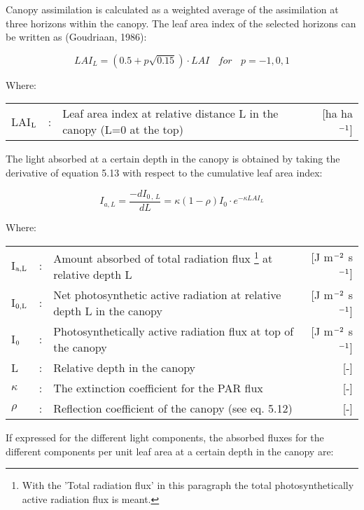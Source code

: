 Canopy assimilation is calculated as a weighted average of the assimilation at three
horizons within the canopy. The leaf area index of the selected horizons can be written as
(Goudriaan, 1986):

\begin{equation}
LAI_{L} = (0.5 + p \sqrt{0.15}) \cdot LAI~~~~for~~~~p = -1,0,1
\end{equation}

 
Where:\\[5pt]
\begin{tabularx}{\textwidth}{llXr}
LAI$_{{\rm L}}$ &:& Leaf area index at relative distance L in the canopy 
    (L=0 at the top)    &    [ha ha$^{{\rm -1}}$]\\
\end{tabularx}

The light absorbed at a certain depth in the canopy is obtained by taking the derivative of
equation 5.13 with respect to the cumulative leaf area index:

\begin{equation}
I_{a,L} = {\frac{-dI _{0\, ,\, L} }{dL}} = \kappa (1 -  \rho) I_{0} \cdot e^{- \kappa LAI_{L}}
\end{equation}

Where:\\[5pt]
\begin{tabularx}{\textwidth}{llXr}
I$_{{\rm a,L}}$ &:& Amount absorbed of total radiation flux
    \footnote{With the 'Total radiation flux' in this paragraph the total photosynthetically 
        active radiation flux is meant.} at relative depth L    &    
    [J m$^{{\rm -2}}$ s$^{{\rm -1}}$]\\
I$_{{\rm 0,L}}$ &:& Net photosynthetic active radiation at relative depth L in 
    the canopy    &    [J m$^{{\rm -2}}$ s$^{{\rm -1}}$]\\
I$_{{\rm 0}}$ &:& Photosynthetically active radiation flux at top of the 
    canopy   &     [J m$^{{\rm -2}}$ s$^{{\rm -1}}$]\\
L &:& Relative depth in the canopy   &     [-]\\
$\kappa$ &:& The extinction coefficient for the PAR flux    &     [-]\\
$\rho$ &:& Reflection coefficient of the canopy (see eq. 5.12)   &     [-]\\
\end{tabularx}

If expressed for the different light components, the absorbed fluxes for the different
components per unit leaf area at a certain depth in the canopy are:

